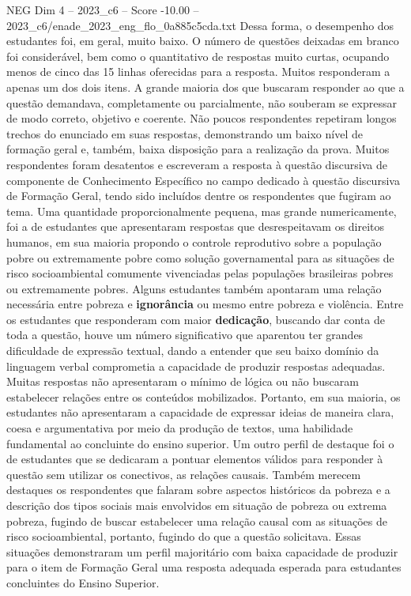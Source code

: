 \begin{textsample}{NEG Dim 4 – 2023\_c6 – Score -10.00 – 2023\_c6/enade\_2023\_eng\_flo\_0a885c5cda.txt}
Dessa forma, o desempenho dos estudantes foi, em geral, muito baixo.
O número de questões deixadas em branco foi considerável, bem como o quantitativo de respostas muito curtas, ocupando menos de cinco das 15 linhas oferecidas para a resposta.
Muitos responderam a apenas um dos dois itens.
A grande maioria dos que buscaram responder ao que a questão demandava, completamente ou parcialmente, não souberam se expressar de modo correto, objetivo e coerente.
Não poucos respondentes repetiram longos trechos do enunciado em suas respostas, demonstrando um baixo nível de formação geral e, também, baixa disposição para a realização da prova.
Muitos respondentes foram desatentos e escreveram a resposta à questão discursiva de componente de Conhecimento Específico no campo dedicado à questão discursiva de Formação Geral, tendo sido incluídos dentre os respondentes que fugiram ao tema.
Uma quantidade proporcionalmente pequena, mas grande numericamente, foi a de estudantes que apresentaram respostas que desrespeitavam os direitos humanos, em sua maioria propondo o controle reprodutivo sobre a população pobre ou extremamente pobre como solução governamental para as situações de risco socioambiental comumente vivenciadas pelas populações brasileiras pobres ou extremamente pobres.
Alguns estudantes também apontaram uma relação necessária entre pobreza e \textbf{ignorância} ou mesmo entre pobreza e violência.
Entre os estudantes que responderam com maior \textbf{dedicação}, buscando dar conta de toda a questão, houve um número significativo que aparentou ter grandes dificuldade de expressão textual, dando a entender que seu baixo domínio da linguagem verbal comprometia a capacidade de produzir respostas adequadas.
Muitas respostas não apresentaram o mínimo de lógica ou não buscaram estabelecer relações entre os conteúdos mobilizados.
Portanto, em sua maioria, os estudantes não apresentaram a capacidade de expressar ideias de maneira clara, coesa e argumentativa por meio da produção de textos, uma habilidade fundamental ao concluinte do ensino superior.
Um outro perfil de destaque foi o de estudantes que se dedicaram a pontuar elementos válidos para responder à questão sem utilizar os conectivos, as relações causais.
Também merecem destaques os respondentes que falaram sobre aspectos históricos da pobreza e a descrição dos tipos sociais mais envolvidos em situação de pobreza ou extrema pobreza, fugindo de buscar estabelecer uma relação causal com as situações de risco socioambiental, portanto, fugindo do que a questão solicitava.
Essas situações demonstraram um perfil majoritário com baixa capacidade de produzir para o item de Formação Geral uma resposta adequada esperada para estudantes concluintes do Ensino Superior.

\end{textsample}
